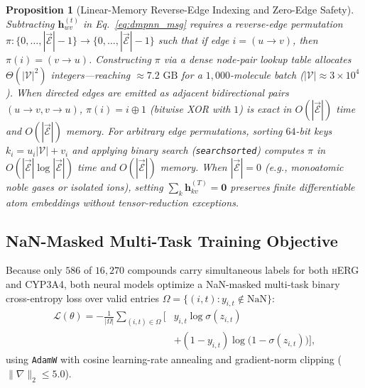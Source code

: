 \documentclass[10pt,twocolumn,letterpaper]{article}
\newtheorem{proposition}{Proposition}
\begin{document}
\begin{proposition}[Linear-Memory Reverse-Edge Indexing and Zero-Edge Safety]
  Subtracting $\mathbf{h}_{wv}^{(t)}$ in Eq.~\eqref{eq:dmpnn_msg} requires a reverse-edge permutation $\pi : \{0,\dots,|\vec{\mathcal{E}}|-1\} \to \{0,\dots,|\vec{\mathcal{E}}|-1\}$ such that if edge $i = (u\!\to\!v)$, then $\pi(i) = (v\!\to\!u)$. Constructing $\pi$ via a dense node-pair lookup table allocates $\Theta(|\mathcal{V}|^2)$ integers—reaching $\approx 7.2\text{ GB}$ for a $1{,}000$-molecule batch ($|\mathcal{V}| \approx 3\times 10^4$). When directed edges are emitted as adjacent bidirectional pairs $(u\!\to\!v, v\!\to\!u)$, $\pi(i) = i \oplus 1$ (bitwise XOR with $1$) is exact in $O(|\vec{\mathcal{E}}|)$ time and $O(|\vec{\mathcal{E}}|)$ memory. For arbitrary edge permutations, sorting $64$-bit keys $k_i = u_i |\mathcal{V}| + v_i$ and applying binary search (\texttt{searchsorted}) computes $\pi$ in $O(|\vec{\mathcal{E}}|\log|\vec{\mathcal{E}}|)$ time and $O(|\vec{\mathcal{E}}|)$ memory. When $|\vec{\mathcal{E}}| = 0$ (e.g., monoatomic noble gases or isolated ions), setting $\sum_{k}\mathbf{h}_{kv}^{(T)} = \mathbf{0}$ preserves finite differentiable atom embeddings without tensor-reduction exceptions.
\end{proposition}

\subsection{NaN-Masked Multi-Task Training Objective}
Because only $586$ of $16{,}270$ compounds carry simultaneous labels for both \textsc{hERG} and \textsc{CYP3A4}, both neural models optimize a NaN-masked multi-task binary cross-entropy loss over valid entries $\Omega = \{(i,t) : y_{i,t} \notin \mathrm{NaN}\}$:
\begin{equation}
\begin{aligned}
  \mathcal{L}(\theta) = -\frac{1}{|\Omega|} \sum_{(i,t)\in\Omega} \Big[ & y_{i,t}\log\sigma(z_{i,t}) \\
  & + (1-y_{i,t})\log\!\big(1-\sigma(z_{i,t})\big) \Big],
\end{aligned}
\end{equation}
using \texttt{AdamW} with cosine learning-rate annealing and gradient-norm clipping ($\|\nabla\|_2 \le 5.0$).
\end{document}
